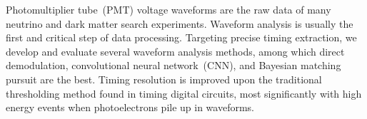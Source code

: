 Photomultiplier tube~(PMT) voltage waveforms are the raw data of many neutrino and dark matter search experiments.  Waveform analysis is usually the first and critical step of data processing.  Targeting precise timing extraction, we develop and evaluate several waveform analysis methods, among which direct demodulation, convolutional neural network~(CNN), and Bayesian matching pursuit are the best.  Timing resolution is improved upon the traditional thresholding method found in timing digital circuits, most significantly with high energy events when photoelectrons pile up in waveforms. 
